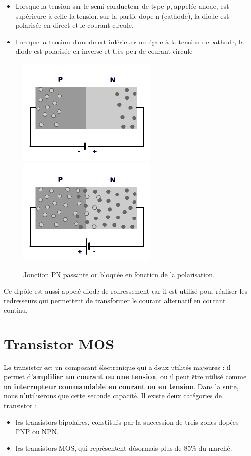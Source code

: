 \begin{itemize}
  \item Lorsque la tension sur le semi-conducteur de type p, appelée anode, est supérieure à celle la tension sur la partie dope n (cathode), la diode est polarisée en direct et le courant circule.
  \item Lorsque la tension d'anode est inférieure ou égale à la tension de cathode, la diode est polarisée en inverse et très peu de courant circule.
\end{itemize}

\begin{figure}[h!bt]
  \begin{center}
    \includegraphics[scale=0.4]{figures/Diffusion3.png}
    \includegraphics[scale=0.4]{figures/Diffusion4.png}
    \caption{Jonction PN passante ou bloquée en fonction de la polarisation.}
  \end{center}
\end{figure}

Ce dipôle est aussi appelé diode de redressement car il est utilisé pour réaliser les redresseurs qui permettent de transformer le courant alternatif en courant continu.

\section{Transistor MOS}

Le transistor est un composant électronique qui a deux utilités majeures : il permet d'{\bf amplifier un courant ou une tension}, ou il peut être utilisé comme un {\bf interrupteur commandable en courant ou en tension}. Dans la suite, nous n'utiliserons que cette seconde capacité. Il existe deux catégories de transistor :
\begin{itemize}
\item les transistors bipolaires, constitués par la succession de trois zones dopées PNP ou NPN.
\item les transistors MOS, qui représentent désormais plus de 85\% du marché.
\end{itemize}


